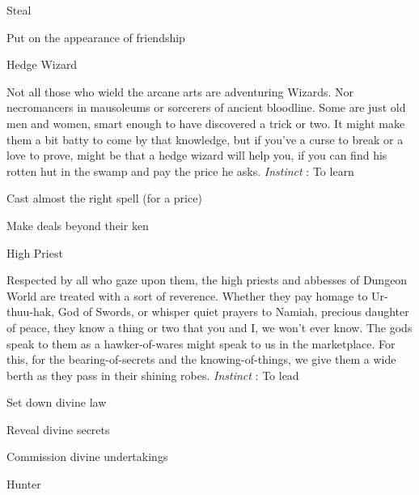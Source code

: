 \startitemize[1,packed]

\item Steal

 
\item Put on the appearance of friendship


\stopitemize
 
\startMonsterName
Hedge Wizard	 
\stopMonsterName
 
\startMonsterDescription
Not all those who wield the arcane arts are adventuring Wizards. Nor necromancers in mausoleums or sorcerers of ancient bloodline. Some are just old men and women, smart enough to have discovered a trick or two. It might make them a bit batty to come by that knowledge, but if you’ve a curse to break or a love to prove, might be that a hedge wizard will help you, if you can find his rotten hut in the swamp and pay the price he asks. {\em Instinct} : To learn
\stopMonsterDescription
 
\startitemize[1,packed]

\item Cast almost the right spell (for a price)

 
\item Make deals beyond their ken


\stopitemize
 
\startMonsterName
High Priest	
\stopMonsterName
 
\startMonsterDescription
Respected by all who gaze upon them, the high priests and abbesses of Dungeon World are treated with a sort of reverence. Whether they pay homage to Ur-thuu-hak, God of Swords, or whisper quiet prayers to Namiah, precious daughter of peace, they know a thing or two that you and I, we won’t ever know. The gods speak to them as a hawker-of-wares might speak to us in the marketplace. For this, for the bearing-of-secrets and the knowing-of-things, we give them a wide berth as they pass in their shining robes. {\em Instinct} : To lead
\stopMonsterDescription
 
\startitemize[1,packed]

\item Set down divine law

 
\item Reveal divine secrets

 
\item Commission divine undertakings


\stopitemize
 
\startMonsterName
Hunter	 
\stopMonsterName
 

